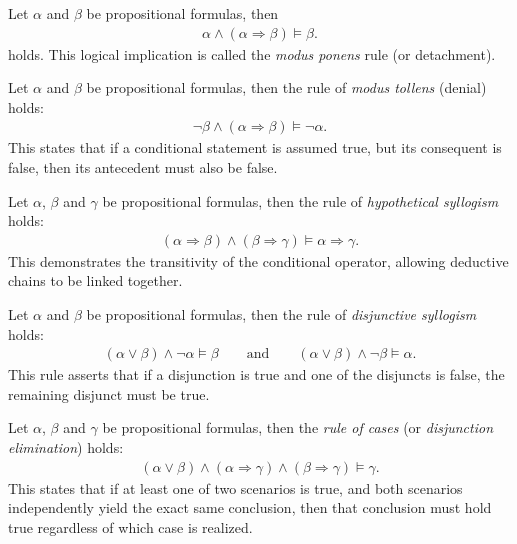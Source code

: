 \begin{examples}
    \begin{exampleenumerate}
        \item Let $\alpha$ and $\beta$ be propositional formulas, then \begin{align}\alpha\land(\alpha\Rightarrow\beta)\vDash\beta.\end{align}
        holds. This logical implication is called the \emph{modus ponens} rule (or detachment).

        \item Let $\alpha$ and $\beta$ be propositional formulas, then the rule of \emph{modus tollens} (denial) holds:
        \begin{align}\lnot\beta \land (\alpha\Rightarrow\beta)\vDash\lnot\alpha.\end{align}
        This states that if a conditional statement is assumed true, but its consequent is false, then its antecedent must also be false.

        \item Let $\alpha$, $\beta$ and $\gamma$ be propositional formulas, then the rule of \emph{hypothetical syllogism} holds:
        \begin{align}(\alpha\Rightarrow\beta) \land (\beta\Rightarrow\gamma)\vDash\alpha\Rightarrow\gamma.\end{align}
        This demonstrates the transitivity of the conditional operator, allowing deductive chains to be linked together.

        \item Let $\alpha$ and $\beta$ be propositional formulas, then the rule of \emph{disjunctive syllogism} holds:
        \begin{align}(\alpha\lor\beta) \land \lnot\alpha\vDash\beta \qquad\text{and}\qquad (\alpha\lor\beta) \land \lnot\beta\vDash\alpha.\end{align}
        This rule asserts that if a disjunction is true and one of the disjuncts is false, the remaining disjunct must be true.

        \item Let $\alpha$, $\beta$ and $\gamma$ be propositional formulas, then the \emph{rule of cases} (or \emph{disjunction elimination}) holds:
        \begin{align}(\alpha\lor\beta) \land (\alpha\Rightarrow\gamma) \land (\beta\Rightarrow\gamma)\vDash\gamma.\end{align}
        This states that if at least one of two scenarios is true, and both scenarios independently yield the exact same conclusion, then that conclusion must hold true regardless of which case is realized.


\end{exampleenumerate}
\end{examples}
